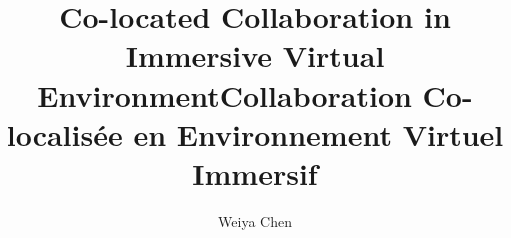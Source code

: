 \documentclass[logos]{orsay-thesis}  %
\author{Weiya Chen}
\title[english]{Co-located Collaboration in Immersive Virtual Environment}
\title[french]{Collaboration Co-localisée en Environnement Virtuel Immersif}
\begin{document}

\pagestyle{empty}

\dominitoc %

\iffalse
\pagebreak\strut
\newpage
\chapter*{Acknowledgement}

\clearpage

\chapter*{}
\thispagestyle{empty}
\textit{\hfill The spring silk worm \newline \null\hfill will weave its thread until it dies;\newline\newline \null\hfill The wax candle \newline \null\hfill will shed tears until it turns to ashes. \newline\newline \null\hfill - To my family}
\fi


\chapter*{}





\end{document}
